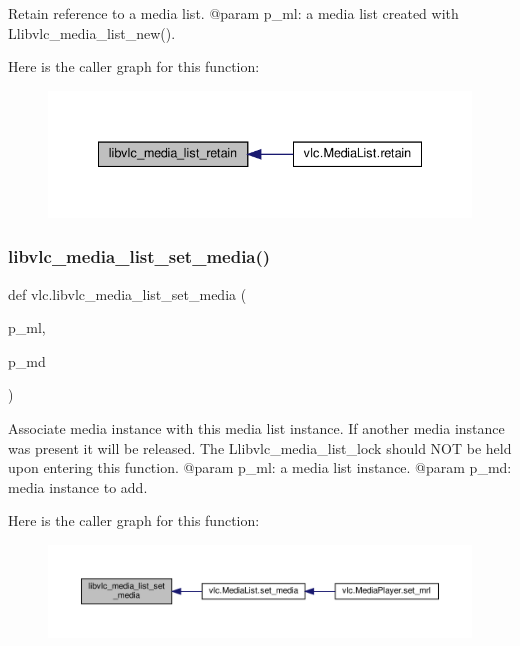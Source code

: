 \begin{DoxyVerb}Retain reference to a media list.
@param p_ml: a media list created with L{libvlc_media_list_new}().
\end{DoxyVerb}
 Here is the caller graph for this function\+:
\nopagebreak
\begin{figure}[H]
\begin{center}
\leavevmode
\includegraphics[width=335pt]{namespacevlc_a2261e153f34f4ba9fca2040530402c06_icgraph}
\end{center}
\end{figure}
\mbox{\label{namespacevlc_a0d46d9803abd7e8b6dfca391921dcff0}} 
\subsubsection{\texorpdfstring{libvlc\+\_\+media\+\_\+list\+\_\+set\+\_\+media()}{libvlc\_media\_list\_set\_media()}}
{\footnotesize\ttfamily def vlc.\+libvlc\+\_\+media\+\_\+list\+\_\+set\+\_\+media (\begin{DoxyParamCaption}\item[{}]{p\+\_\+ml,  }\item[{}]{p\+\_\+md }\end{DoxyParamCaption})}

\begin{DoxyVerb}Associate media instance with this media list instance.
If another media instance was present it will be released.
The L{libvlc_media_list_lock} should NOT be held upon entering this function.
@param p_ml: a media list instance.
@param p_md: media instance to add.
\end{DoxyVerb}
 Here is the caller graph for this function\+:
\nopagebreak
\begin{figure}[H]
\begin{center}
\leavevmode
\includegraphics[width=350pt]{namespacevlc_a0d46d9803abd7e8b6dfca391921dcff0_icgraph}
\end{center}
\end{figure}
\mbox{\label{namespacevlc_a6bfee9141e7623012496f9586c55aac6}} 
